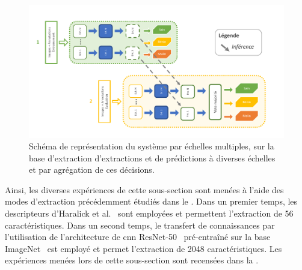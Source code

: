 \begin{figure}[H]
    \centering
    \includegraphics[width=\linewidth]{contents/chapter_6/resources/scheme_image_improvement_multiscale_decision.pdf}
    \caption{Schéma de représentation du système par échelles multiples, sur la base d'extraction d'extractions et de prédictions à diverses échelles et par agrégation de ces décisions.}
    \label{fig:scheme_image_improvement_multiscale_decision}
\end{figure}\par

Ainsi, les diverses expériences de cette sous-section sont menées à l'aide des modes d'extraction précédemment étudiés dans le . Dans un premier temps, les descripteurs d'Haralick et al.~\cite{Haralick1973} sont employées et permettent l'extraction de 56 caractéristiques. Dans un second temps, le transfert de connaissances par l'utilisation de l'architecture de \gls{cnn} ResNet-50~\cite{He2016} pré-entraîné sur la base ImageNet~\cite{Canziani2016} est employé et permet l'extraction de 2048 caractéristiques. Les expériences menées lors de cette sous-section sont recensées dans la .\par

